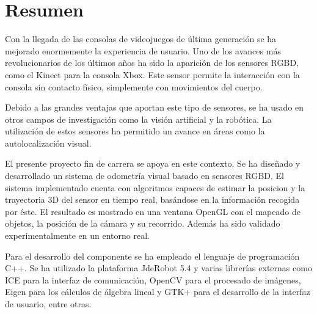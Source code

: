 \chapter*{Resumen}

Con la llegada de las consolas de videojuegos de última generación se ha mejorado enormemente la experiencia de usuario. Uno de los avances más revolucionarios de los últimos años ha sido la aparición de los sensores RGBD, como el Kinect para la consola Xbox. Este sensor permite la interacción con la consola sin contacto físico, simplemente con movimientos del cuerpo.

Debido a las grandes ventajas que aportan este tipo de sensores, se ha usado en otros campos de investigación como la visión artificial y la robótica. La utilización de estos sensores ha permitido un avance en áreas como la autolocalización visual.

El presente proyecto fin de carrera se apoya en este contexto. Se ha diseñado y desarrollado un sistema de odometría visual basado en sensores RGBD. El sistema implementado cuenta con algoritmos capaces de estimar la posicion y la trayectoria 3D del sensor en tiempo real, basándose en la información recogida por éste. El resultado es mostrado en una ventana OpenGL con el mapeado de objetos, la posición de la cámara y su recorrido. Además ha sido validado experimentalmente en un entorno real.

Para el desarrollo del componente se ha empleado el lenguaje de programación C++. Se ha utilizado la plataforma JdeRobot 5.4 y varias librerías externas como ICE para la interfaz de comunicación, OpenCV para el procesado de imágenes, Eigen para los cálculos de álgebra lineal y GTK+ para el desarrollo de la interfaz de usuario, entre otras.